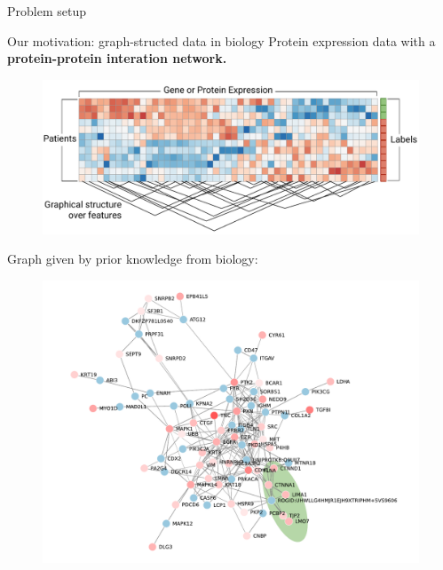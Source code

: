 \documentclass[svgnames,final]{beamer}
\begin{document}
\begin{frame}
\begin{columns}[T]
\begin{column}{.3\linewidth}
\begin{block}{Problem setup}
    

	\end{block}

	\vspace{1.0cm}

	\begin{block}{Our motivation: graph-structed data in biology}
		Protein expression data with a \textbf{protein-protein interation network.}\\[-.2cm]
		\begin{figure}[h]
		\centering
		\includegraphics[width=.8\linewidth]{images/matrix.pdf}
		\end{figure}

		Graph given by prior knowledge from biology:\\[-.6cm]

		\begin{figure}[h]
		\centering
		\includegraphics[width=0.7\linewidth]{images/graph.pdf}
		\end{figure}

		\vspace{-1.5cm}

	\end{block}

	\vspace{2cm}

\end{column}


\end{columns}
\end{frame}
\end{document}
